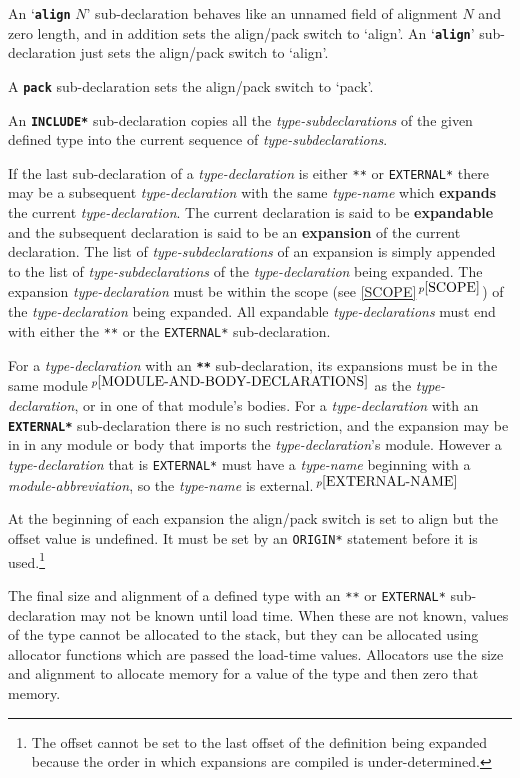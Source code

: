 \documentclass[12pt]{article}
\newcommand{\key}[1]{{\rm \bfseries #1}}
\newcommand{\ttkey}[1]{{\tt \bfseries #1}}
\newcommand{\skey}[2]{{\rm \bfseries #1#2}}
\newcommand{\itemref}[1]{\ref{#1}$\,^{p\pageref{#1}}$}
\newcommand{\pagnote}[1]{$\,^{p\pageref{#1}}$}
\begin{document}
An `\ttkey{align} $N$' sub-declaration behaves like an unnamed
field of alignment $N$ and zero length,
and in addition sets the align/pack switch to `align'.
An `\ttkey{align}' sub-declaration just sets the
align/pack switch to `align'.

A \ttkey{pack} sub-declaration sets the align/pack switch to `pack'.

An \ttkey{*INCLUDE*} sub-declaration copies all the {\em type-subdeclarations}
of the given defined type into the current sequence of
{\em type-subdeclarations}.

If the last sub-declaration of a {\em type-declaration}
is either {\tt ***}\label{***} or {\tt *EXTERNAL*}\label{*EXTERNAL*}
there may be a subsequent {\em type-declaration} with the same
{\em type-name} which \skey{expand}s the current {\em type-declaration}.
The current declaration is said to be \key{expandable} and
the subsequent declaration is said to be an \key{expansion}
of the current declaration.
The list of {\em type-subdeclarations}\label{TYPE-DECLARATION-APPEND}
of an expansion is simply appended to the list of
{\em type-subdeclarations} of the {\em type-declaration} being expanded.
The expansion {\em type-declaration}
must be within the scope (see \itemref{SCOPE}) of the {\em type-declaration}
being expanded.   All expandable {\em type-declarations} must end with
either the {\tt ***} or the {\tt *EXTERNAL*} sub-declaration.

For a {\em type-declaration} with an \ttkey{***} sub-declaration,
its expansions must be in the same module\pagnote{MODULE-AND-BODY-DECLARATIONS}
as the {\em type-declaration}, or in one of that module's bodies.
For a {\em type-declaration} with an \ttkey{*EXTERNAL*} sub-declaration
there is no such restriction, and the expansion may be in
in any module or body that imports the {\em type-declaration}'s
module.  However a {\em type-declaration} that is {\tt *EXTERNAL*}
must have a {\em type-name} beginning with a {\em module-abbreviation}, so
the {\em type-name} is external.\pagnote{EXTERNAL-NAME}

At the beginning of each expansion the align/pack switch is set to align
but the offset value is undefined.  It must be set by an {\tt *ORIGIN*}
statement before it is used.\footnote{The offset cannot be set to the
last offset of the definition being expanded because the order in which
expansions are compiled is under-determined.}

The final size and alignment of a defined type with an {\tt ***}
or {\tt *EXTERNAL*}
sub-declara\-tion may not be known until load time.  When these are not known,
values of the type cannot be allocated to the stack, but
they can be allocated using allocator functions which are passed
the load-time values.
Allocators use the size and alignment to allocate memory for a value of
the type and then zero that memory.
\end{document}
